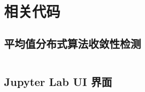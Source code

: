 \chapter{相关代码}
\label{cha:Code}

\section{平均值分布式算法收敛性检测}
\label{sec:Consensus}











\inputminted[mathescape, linenos, breaklines]{python3}{Code/Consensus.py}


\section{Jupyter Lab UI 界面}
\label{sec:JupyterLabUI-Code}
\inputminted[mathescape, linenos, breaklines]{python3}{Code/UI.py}